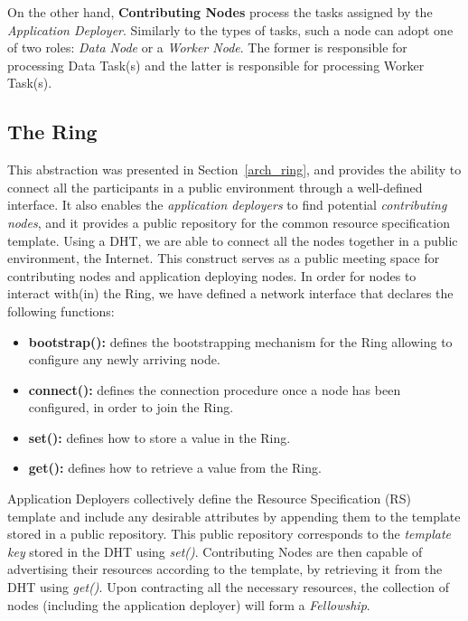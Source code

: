 \documentclass[12pt, titlepage]{uo_temp}
\begin{document}
     On the other hand, \textbf{Contributing Nodes} process the tasks assigned by the
     \emph{Application Deployer}. Similarly to the types of tasks, such a node can adopt
     one of two roles: \emph{Data Node} or a \emph{Worker Node}. The former is responsible
     for processing Data Task(s) and the latter is responsible for processing Worker
     Task(s).

     \subsection{The Ring}
     This abstraction was presented in Section~\ref{arch_ring}, and provides the ability
     to connect all the participants in a public environment through a well-defined
     interface. It also enables the \emph{application deployers} to find potential
     \emph{contributing nodes}, and it provides a public repository for the common resource
     specification template.
     Using a DHT, we are able to connect all the nodes together in a public
     environment, the Internet. This construct serves as a public meeting space for
     contributing nodes and application deploying nodes.
     In order for nodes to interact with(in) the Ring, we have defined a network interface
     that declares the following functions:
     \begin{itemize}
     \item \textbf{bootstrap():} defines the bootstrapping mechanism for the Ring allowing
       to configure any newly arriving node.
     \item \textbf{connect():} defines the connection procedure once a node has been
       configured, in order to join the Ring.
     \item \textbf{set():} defines how to store a value in the Ring.
     \item \textbf{get():} defines how to retrieve a value from the Ring.
     \end{itemize}
     Application Deployers collectively define the Resource Specification (RS) template
     and include any desirable attributes by appending them to the template stored in a
     public repository. This public repository corresponds to the \emph{template key}
     stored in the DHT using \emph{set()}.
     Contributing Nodes are then capable of advertising their resources according to the
     template, by retrieving it from the DHT using \emph{get()}. Upon contracting all the necessary
     resources, the collection of nodes (including the application deployer) will form a
     \emph{Fellowship}.
\end{document}
